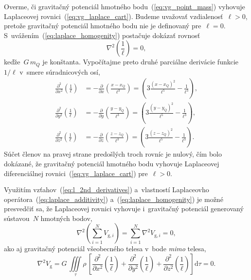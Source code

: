 \documentclass[a4paper,12pt]{book}
\newcommand{\diff}{\mathrm d}
\newcommand{\gidx}{\mathrm g}
\begin{document}
Overme, či gravitačný potenciál hmotného bodu~(\ref{eq:vg_point_mass}) vyhovuje 
Laplaceovej rovnici~(\ref{eq:vg_laplace_cart}).  Budeme uvažovať 
vzdialenosť~$\ell > 0$, pretože gravitačný potenciál hmotného bodu nie je 
definovaný pre~$\ell = 0$.  S~uvážením~(\ref{eq:laplace_homogenity}) postačuje 
dokázať rovnosť
%
\begin{equation}
\label{eq:nabla_l}
\nabla^2 \left( \frac{1}{\ell} \right) = 0{,}
\end{equation}
%
keďže~$G \, m_Q$ je konštanta.  Vypočítajme preto druhé parciálne
derivácie funkcie~$1 \slash \ell$ v~smere súradnicových osí,
%
\begin{equation}
\label{eq:l_2nd_derivatives}
\begin{split}
\frac{\partial^2}{\partial x^2} \left( \frac{1}{\ell} \right) &=
-\frac{\partial}{\partial x} \left( \frac{x - x_Q}{\ell^3} \right) = \left(3
\frac{(x - x_Q)^2}{\ell^5} - \frac{1}{\ell^3} \right){,}\\
%
\frac{\partial^2}{\partial y^2} \left( \frac{1}{\ell} \right) &=
-\frac{\partial}{\partial y} \left( \frac{y - y_Q}{\ell^3} \right) = \left(3
\frac{(y - y_Q)^2}{\ell^5} - \frac{1}{\ell^3} \right){,}\\
%
\frac{\partial^2}{\partial z^2} \left( \frac{1}{\ell} \right) &=
-\frac{\partial}{\partial z} \left( \frac{z - z_Q}{\ell^3} \right) = \left(3
\frac{(z - z_Q)^2}{\ell^5} - \frac{1}{\ell^3} \right){.}
\end{split}
\end{equation}
%
Súčet členov na pravej strane predošlých troch rovníc je nulový, čím bolo
dokázané, že gravitačný potenciál hmotného bodu vyhovuje Laplaceovej
diferenciálnej rovnici~(\ref{eq:vg_laplace_cart}) pre~$\ell > 0$.

Využitím vzťahov~(\ref{eq:l_2nd_derivatives}) a~vlastností Laplaceovho
operátora~(\ref{eq:laplace_additivity}) a~(\ref{eq:laplace_homogenity}) je
možné presvedčiť sa, že Laplaceovej rovnici vyhovuje i~gravitačný potenciál
generovaný sústavou~$N$ hmotných bodov,
%
\begin{equation}
\nabla^2 \left( \sum_{i = 1}^N V_{\gidx,i} \right) = \sum_{i = 1}^N \nabla^2
V_{\gidx,i} = 0{,}
\end{equation}
%
ako aj gravitačný potenciál všeobecného telesa v~bode \emph{mimo} telesa,
%
\begin{equation}
\nabla^2 V_\gidx = G\, \iiint\limits_\tau \rho \, \left[ 
\frac{\partial^2}{\partial
x^2}\left(\frac{1}{\ell}\right) + \frac{\partial^2}{\partial
y^2}\left(\frac{1}{\ell}\right) + \frac{\partial^2}{\partial
z^2}\left(\frac{1}{\ell}\right) \right] \diff\tau = 0{.}
\end{equation}
\end{document}
